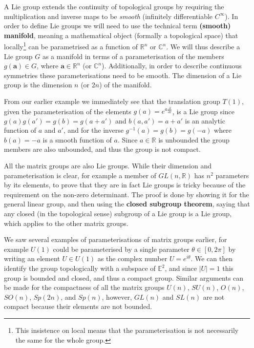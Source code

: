\documentclass[notes.tex]{subfiles}
\begin{document}
A Lie group extends the continuity of topological groups by requiring the multiplication and inverse maps to be {\it smooth} (infinitely differentiable $C^\infty$).
In order to define Lie groups we will need to use the technical term {\bf (smooth) manifold}, meaning a mathematical object (formally a topological space) that locally\footnote{This insistence on local means that the parameterisation is not necessarily the same for the whole group.} can be parametrised as a function of  $\mathbb{R}^n$ or $\mathbb{C}^n$. We will thus describe a Lie group $G$ as a manifold in terms of a parameterisation of the members $g(\mathbf a)\in G$, where $\mathbf a\in \mathbb{R}^n$ (or $\mathbb{C}^n$). Additionally, in order to describe continuous symmetries these parameterisations need to be smooth.
The dimension of a Lie group is the dimension $n$ (or $2n$) of the manifold.

From our earlier example we immediately see that the translation group $T(1)$, given the parameterisation of the elements $g(a) = e^{a\frac{\partial}{\partial x}}$, is a Lie group since $g(a)g(a') =g(b)= g(a+a')$ and $b(a,a')=a+a'$ is an analytic function of $a$ and $a'$, and for the inverse $g^{-1}(a)=g(b)=g(-a)$ where $b(a)=-a$ is a smooth function of $a$. Since $a\in\mathbb R$ is unbounded the group members are also unbounded, and thus the group is not compact.

All the matrix groups are also Lie groups. While their dimension and parameterisation is clear, for example a member of $GL(n,\mathbb R)$ has $n^2$ parameters by its elements, to prove that they are in fact Lie groups is tricky because of the requirement on the non-zero determinant. The proof is done by showing it for the general linear group, and then using the {\bf closed subgroup theorem}, saying that any closed (in the topological sense) subgroup of a Lie group is a Lie group, which applies to the other matrix groups. 

We saw several examples of parameterisations of matrix groups earlier, for example $U(1)$ could be parameterised by a single parameter $\theta\in [0,2\pi]$ by writing an element $U\in U(1)$ as the complex number $U=e^{i\theta}$. We can then identify the group topologically with a subspace of $\mathbb E^2$, and since $|U|=1$ this group is bounded and closed, and thus a compact group. Similar arguments can be made for the compactness of all the matrix groups $U(n)$, $SU(n)$, $O(n)$, $SO(n)$, $Sp(2n)$, and $Sp(n)$, however, $GL(n)$ and $SL(n)$ are not compact because their elements are not bounded.
\end{document}
